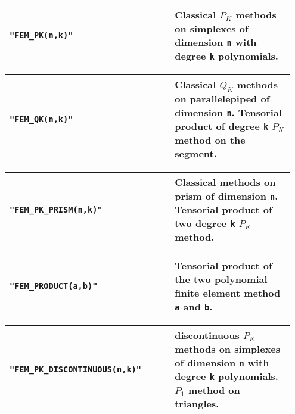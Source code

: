 \begin{center} \begin{tabular}{|m{0.55\linewidth}|m{0.4\linewidth}|} \hline
{\tt "FEM_PK(n,k)"} & Classical $P_K$ methods on simplexes of dimension  {\tt n} with degree {\tt k} polynomials.\\ \hline
\end{tabular}  
\begin{tabular}{|m{0.55\linewidth}|m{0.4\linewidth}|} \hline
{\tt "FEM_QK(n,k)"} & Classical $Q_K$ methods on parallelepiped of dimension {\tt n}. Tensorial product of degree {\tt k} $P_K$ method on the segment. \\ \hline
\end{tabular}  
\begin{tabular}{|m{0.55\linewidth}|m{0.4\linewidth}|} \hline
{\tt "FEM_PK_PRISM(n,k)"} & Classical methods on prism of dimension {\tt n}. Tensorial product of two degree {\tt k} $P_K$ method. \\ \hline
\end{tabular}  
\begin{tabular}{|m{0.55\linewidth}|m{0.4\linewidth}|} \hline
{\tt "FEM_PRODUCT(a,b)"} & Tensorial product of the two polynomial finite element method {\tt a} and {\tt b}. \\ \hline
\end{tabular}   
\begin{tabular}{|m{0.55\linewidth}|m{0.4\linewidth}|} \hline
{\tt "FEM_PK_DISCONTINUOUS(n,k)"} & discontinuous $P_K$ methods on simplexes of dimension  {\tt n} with degree {\tt k} polynomials. $P_1$ method on triangles. \\ \hline
\end{tabular}  
\end{center}
